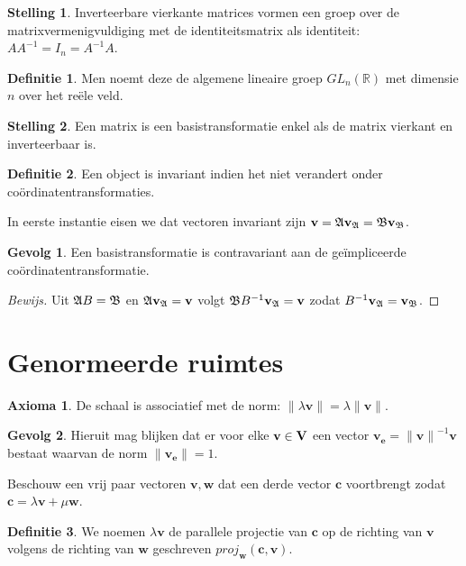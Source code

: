 \documentclass{amsart}
\theoremstyle{definition}
\newtheorem{axm}{Axioma}[section]
\newtheorem{thm}{Stelling}[section]
\newtheorem{dfn}{Definitie}[section]
\newtheorem{csq}{Gevolg}[section]
\newenvironment{bewijs}{\begin{proof}[Bewijs]}{\end{proof}}
\newcommand{\realnums}{\mathbb{R}}
\newcommand{\vecspace}[1][v]{\mathrm{\mathbf{\MakeUppercase#1}}}
\newcommand{\norm}[1]{\lVert{#1}\rVert}
\newcommand{\vvec}[1][v]{\mathbf{#1}}
\newcommand{\uvec}[1][v]{\vvec[#1]_\mathbf{e}}
\newcommand{\vnorm}[1]{\norm{\vvec[#1]}}
\newcommand{\vecrow}[1][a]{\mathfrak{\MakeUppercase{#1}}}
\newcommand{\cvec}[2]{{#1}_{#2}}
\newcommand{\cvecv}[2][v]{\cvec{\vvec[#1]}{#2}}
\newcommand{\cvecva}[1][a]{\cvecv{\vecrow[#1]}}
\begin{document}
\begin{thm}
    Inverteerbare vierkante matrices vormen een groep over de matrixvermenigvuldiging met de identiteitsmatrix als identiteit: $AA^{-1} = I_n = A^{-1}A$.
\end{thm}

\begin{dfn}
    Men noemt deze de algemene lineaire groep $GL_n(\realnums)$ met dimensie $n$ over het reële veld.
\end{dfn}

\begin{thm}
    Een matrix is een basistransformatie enkel als de matrix vierkant en inverteerbaar is.
\end{thm}

\begin{dfn}
    Een object is invariant indien het niet verandert onder coördinatentransformaties.
    
    In eerste instantie eisen we dat vectoren invariant zijn $\vvec = \vecrow \cvecva = \vecrow[b] \cvecva[b]$.
\end{dfn}

\begin{csq}
    Een basistransformatie is contravariant aan de ge\"{i}mpliceerde co\"{o}rdinatentransformatie.
    \begin{bewijs}
        Uit $\vecrow B = \vecrow[b]$ en $\vecrow \cvecva= \vvec$ volgt $\vecrow[b] B^{-1} \cvecva = \vvec$ zodat $B^{-1} \cvecva = \cvecva[b]$.
    \end{bewijs}
\end{csq}

\section{Genormeerde ruimtes}

\begin{axm}
    De schaal is associatief met de norm: $\norm{\lambda \vvec} = \lambda\vnorm v$.
\end{axm}

\begin{csq}
    Hieruit mag blijken dat er voor elke $\vvec \in \vecspace$ een vector $\uvec = {\vnorm v}^{-1}\vvec$ bestaat waarvan de norm $\vnorm \uvec = 1$.
\end{csq}

Beschouw een vrij paar vectoren $\vvec, \vvec[w]$ dat een derde vector $\vvec[c]$ voortbrengt zodat $\vvec[c] = \lambda \vvec + \mu \vvec[w]$.

\begin{dfn}
    We noemen $\lambda\vvec$ de parallele projectie van $\vvec[c]$ op de richting van $\vvec$ volgens de richting van $\vvec[w]$ geschreven $proj_{\vvec[w]}(\vvec[c], \vvec)$.
\end{dfn}
\end{document}
